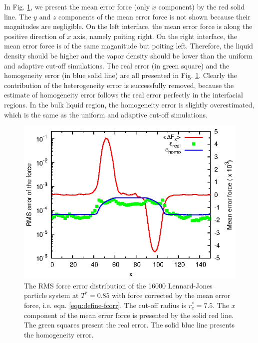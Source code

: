 \documentclass[aps,pre,preprint]{revtex4}
\begin{document}
In Fig. \ref{fig:tmp4}, we present the mean error force (only $x$
component) by the red solid line. The $y$ and $z$ components of the
mean error force is not shown because their magnitudes are negligible.
On the left interface, the mean error force is along the positive
direction of $x$ axis, namely poiting right.  On the right interface,
the mean error force is of the same maganitude but poiting
left. Therefore, the liquid density should be higher and the vapor
density should be lower than the uniform and adaptive cut-off
simulations.  The real error (in green square) and the homogeneity
error (in blue solid line) are all presented in
Fig. \ref{fig:tmp4}. Clearly the contribution of the heterogeneity
error is successfully removed, because the estimate of homogeneity
error follows the real error perfectly in the interfacial regions.  In
the bulk liquid region, the homogeneity error is slightly
overestimated, which is the same as the uniform and adaptive cut-off
simulations.

\begin{figure}
  \centering
  \includegraphics[]{fig/t0.85-n16000-fcorr-rc07.5-feq0200/fcorr.and.error.eps}
  \caption{ The RMS force error distribution of the 16000
    Lennard-Jones particle system at $T^\ast=0.85$ with force
    corrected by the mean error force,
    i.e. eqn. \eqref{eqn:define-fcorr}. The cut-off radius is $r^\ast_c =
    7.5$. The $x$ component of the mean error force is presented by
    the solid red line. The green squares present the real error. The
    solid blue line presents the homogeneity error. }
  \label{fig:tmp4}
\end{figure}
\end{document}
